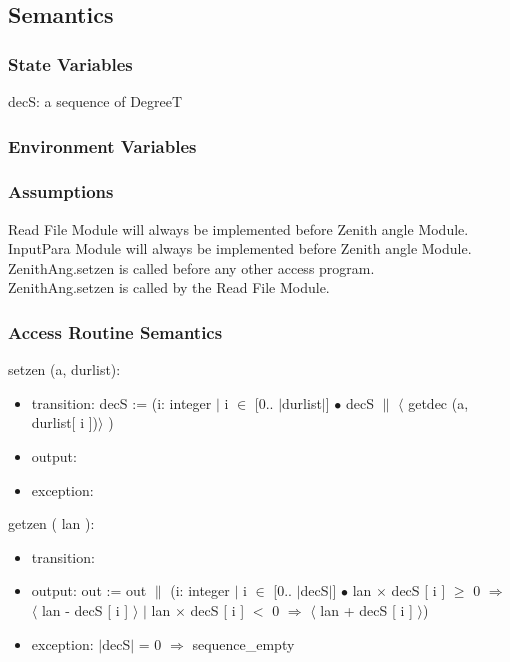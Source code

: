 \documentclass[12pt, titlepage]{article}
\begin{document}
\subsection{Semantics}

\subsubsection{State Variables}

decS: a sequence of DegreeT\\



\subsubsection{Environment Variables}




\subsubsection{Assumptions}
Read File Module will always be implemented before Zenith angle Module. \\
InputPara Module will always be implemented before Zenith angle Module.\\
ZenithAng.setzen is called before any other access program.\\
ZenithAng.setzen is called by the Read File Module.


\subsubsection{ Access Routine Semantics}


\noindent setzen (a, durlist):
\begin{itemize}
\item transition: decS := (i: integer $|$ i $\in$ [0.. $|$durlist$|$] $\bullet$ decS $\|$ $\langle$ getdec (a, durlist[ i ])$\rangle$ )

\item output: 
\item exception: 
\end{itemize}

\noindent  getzen ( lan ):
\begin{itemize}
\item transition:

\item output: out := out $\|$ (i: integer $|$ i $\in$ [0.. $|$decS$|$] $\bullet$ lan $\times$ decS [ i ] $\geq$ 0 $\Rightarrow$ $\langle$ lan - decS [  i ] $\rangle$ $|$ lan $\times$ decS [ i ] $<$ 0 $\Rightarrow$ $\langle$ lan + decS [ i ] $\rangle$)\\


\item exception: $|$decS$|$ = 0 $\Rightarrow$ sequence\_empty
\end{itemize}
\end{document}
